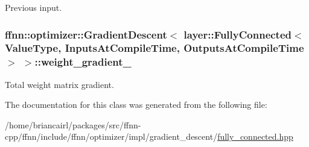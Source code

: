 Previous input. 

\hypertarget{classffnn_1_1optimizer_1_1_gradient_descent_3_01layer_1_1_fully_connected_3_01_value_type_00_01_5f7b01db2ae4d39760d70ee323649a60_a3a3cad49f1855a20dbf9ff62178bf9ff}{
\subsubsection[{weight\-\_\-gradient\-\_\-}]{ {\bf ffnn\-::optimizer\-::\-Gradient\-Descent}$<$ {\bf layer\-::\-Fully\-Connected}$<$ Value\-Type, Inputs\-At\-Compile\-Time, Outputs\-At\-Compile\-Time $>$ $>$\-::weight\-\_\-gradient\-\_\-\hspace{0.3cm}{\ttfamily [protected]}}}\label{classffnn_1_1optimizer_1_1_gradient_descent_3_01layer_1_1_fully_connected_3_01_value_type_00_01_5f7b01db2ae4d39760d70ee323649a60_a3a3cad49f1855a20dbf9ff62178bf9ff}


Total weight matrix gradient. 



The documentation for this class was generated from the following file\-:\begin{DoxyCompactItemize}
\item 
/home/briancairl/packages/src/ffnn-\/cpp/ffnn/include/ffnn/optimizer/impl/gradient\-\_\-descent/\hyperlink{optimizer_2impl_2gradient__descent_2fully__connected_8hpp}{fully\-\_\-connected.\-hpp}\end{DoxyCompactItemize}
